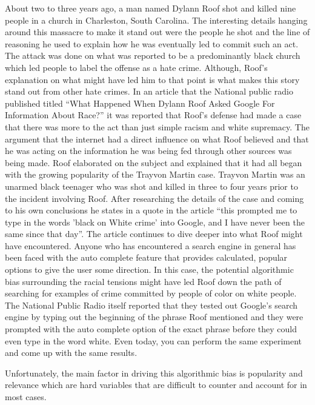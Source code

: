 \documentclass[sigconf]{acmart}
\begin{document}
About two to three years ago, a man named Dylann Roof shot and killed nine people in a church in Charleston, South Carolina. The interesting details hanging around this massacre to make it stand out were the people he shot and the line of reasoning he used to explain how he was eventually led to commit such an act. The attack was done on what was reported to be a predominantly black church which led people to label the offense as a hate crime. Although, Roof's explanation on what might have led him to that point is what makes this story stand out from other hate crimes. In an article that the National public radio published titled ``What Happened When Dylann Roof Asked Google For Information About Race?'' it was reported that Roof's defense had made a case that there was more to the act than just simple racism and white supremacy\cite{Hersher2017}. The argument that the internet had a direct influence on what Roof believed and that he was acting on the information he was being fed through other sources was being made. Roof elaborated on the subject and explained that it had all began with the growing popularity of the Trayvon Martin case. Trayvon Martin was an unarmed black teenager who was shot and killed in three to four years prior to the incident involving Roof. After researching the details of the case and coming to his own conclusions he states in a quote in the article ``this prompted me to type in the words 'black on White crime' into Google, and I have never been the same since that day''\cite{Hersher2017}. The article continues to dive deeper into what Roof might have encountered. Anyone who has encountered a search engine in general has been faced with the auto complete feature that provides calculated, popular options to give the user some direction. In this case, the potential algorithmic bias surrounding the racial tensions might have led Roof down the path of searching for examples of crime committed by people of color on white people. The National Public Radio itself reported that they tested out Google's search engine by typing out the beginning of the phrase Roof mentioned and they were prompted with the auto complete option of the exact phrase before they could even type in the word white\cite{Hersher2017}. Even today, you can perform the same experiment and come up with the same results.

Unfortunately, the main factor in driving this algorithmic bias is popularity and relevance which are hard variables that are difficult to counter and account for in most cases. 
\end{document}
